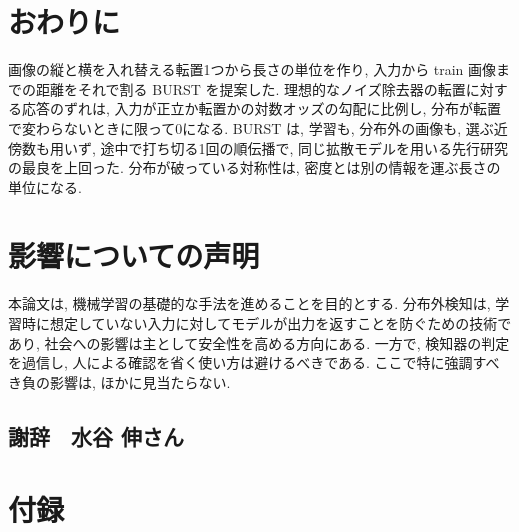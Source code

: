 \documentclass[MIRU,submit]{miru2025j}
\newcommand{\method}{BURST}                 %
\begin{document}
\section{おわりに}
画像の縦と横を入れ替える転置1つから長さの単位を作り, 入力から train 画像までの距離をそれで割る \method{} を提案した. 理想的なノイズ除去器の転置に対する応答のずれは, 入力が正立か転置かの対数オッズの勾配に比例し, 分布が転置で変わらないときに限って0になる. \method{} は, 学習も, 分布外の画像も, 選ぶ近傍数も用いず, 途中で打ち切る1回の順伝播で, 同じ拡散モデルを用いる先行研究の最良を上回った. 分布が破っている対称性は, 密度とは別の情報を運ぶ長さの単位になる.

\section*{影響についての声明}
本論文は, 機械学習の基礎的な手法を進めることを目的とする. 分布外検知は, 学習時に想定していない入力に対してモデルが出力を返すことを防ぐための技術であり, 社会への影響は主として安全性を高める方向にある. 一方で, 検知器の判定を過信し, 人による確認を省く使い方は避けるべきである. ここで特に強調すべき負の影響は, ほかに見当たらない.

\subsection*{{\normalsize 謝辞　水谷 伸さん}}




\onecolumn
\raggedbottom
\setlength{\intextsep}{6pt plus 2pt minus 2pt}
\section*{付録}
\renewcommand{\thetable}{A\arabic{table}}\setcounter{table}{0}
\renewcommand{\thefigure}{A\arabic{figure}}\setcounter{figure}{0}
\end{document}
